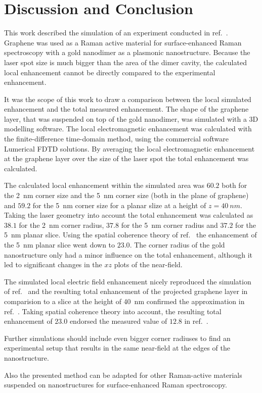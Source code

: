 \newpage
\section{Discussion and Conclusion}

This work described the simulation of an experiment conducted in ref.~\cite{heeg}. Graphene was used as a Raman active material for surface-enhanced Raman spectroscopy with a gold nanodimer as a plasmonic nanostructure. Because the laser spot size is much bigger than the area of the dimer cavity, the calculated local enhancement cannot be directly compared to the experimental enhancement.

It was the scope of this work to draw a comparison between the local simulated enhancement and the total measured enhancement. The shape of the graphene layer, that was suspended on top of the gold nanodimer, was simulated with a 3D modelling software. The local electromagnetic enhancement was calculated with the finite-difference time-domain method, using the commercial software Lumerical FDTD solutions. By averaging the local electromagnetic enhancement at the graphene layer over the size of the laser spot the total enhancement was calculated.

The calculated local enhancement within the simulated area was $60.2$  both for the \SI{2}{nm} corner size and the \SI{5}{nm} corner size (both in the plane of graphene) and $59.2$ for the \SI{5}{nm} corner size for a planar slize at a height of $z=\SI{40}{nm}$. Taking the laser geometry into account the total enhancement was calculated as $38.1$ for the \SI{2}{nm} corner radius, $37.8$ for the \SI{5}{nm} corner radius and $37.2$ for the \SI{5}{nm} planar slice. Using the spatial coherence theory of ref.~\cite{coherence} the enhancement of the \SI{5}{nm} planar slice went down to $23.0$. The corner radius of the gold nanostructure only had a minor influence on the total enhancement, although it led to significant changes in the $xz$ plots of the near-field.

The simulated local electric field enhancement nicely reproduced the simulation of ref.~\cite{heeg} and the resulting total enhancement of the projected graphene layer in comparision to a slice at the height of \SI{40}{nm} confirmed the approximation in ref.~\cite{heeg}. Taking spatial coherence theory into account, the resulting total enhancement of $23.0$ endorsed the measured value of $12.8$ in ref.~\cite{heeg}.

Further simulations should include even bigger corner radiuses to find an experimental setup that results in the same near-field at the edges of the nanostructure.

Also the presented method can be adapted for other Raman-active materials suspended on nanostructures for
surface-enhanced Raman spectroscopy.
